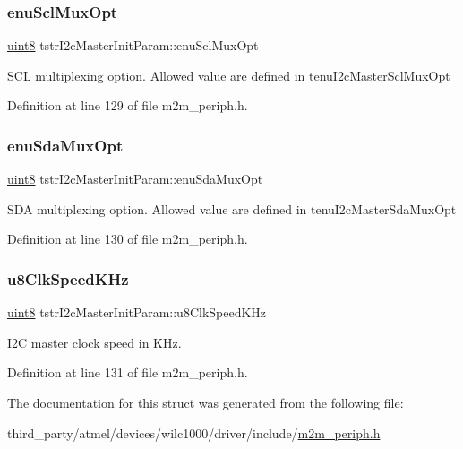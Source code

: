 \subsubsection{\texorpdfstring{enu\+Scl\+Mux\+Opt}{enuSclMuxOpt}}
{\footnotesize\ttfamily \hyperlink{group__DataT_ga4df709a77647e870bbf1d955b8edc9a6}{uint8} tstr\+I2c\+Master\+Init\+Param\+::enu\+Scl\+Mux\+Opt}

S\+CL multiplexing option. Allowed value are defined in tenu\+I2c\+Master\+Scl\+Mux\+Opt 

Definition at line 129 of file m2m\+\_\+periph.\+h.

\mbox{\label{structtstrI2cMasterInitParam_a2ccf575c48101934f675e9ac964a9ee5}} 
\subsubsection{\texorpdfstring{enu\+Sda\+Mux\+Opt}{enuSdaMuxOpt}}
{\footnotesize\ttfamily \hyperlink{group__DataT_ga4df709a77647e870bbf1d955b8edc9a6}{uint8} tstr\+I2c\+Master\+Init\+Param\+::enu\+Sda\+Mux\+Opt}

S\+DA multiplexing option. Allowed value are defined in tenu\+I2c\+Master\+Sda\+Mux\+Opt 

Definition at line 130 of file m2m\+\_\+periph.\+h.

\mbox{\label{structtstrI2cMasterInitParam_a30a28a8cbc543e37689b5b2b363fee21}} 
\subsubsection{\texorpdfstring{u8\+Clk\+Speed\+K\+Hz}{u8ClkSpeedKHz}}
{\footnotesize\ttfamily \hyperlink{group__DataT_ga4df709a77647e870bbf1d955b8edc9a6}{uint8} tstr\+I2c\+Master\+Init\+Param\+::u8\+Clk\+Speed\+K\+Hz}

I2C master clock speed in K\+Hz. 

Definition at line 131 of file m2m\+\_\+periph.\+h.



The documentation for this struct was generated from the following file\+:\begin{DoxyCompactItemize}
\item 
third\+\_\+party/atmel/devices/wilc1000/driver/include/\hyperlink{m2m__periph_8h}{m2m\+\_\+periph.\+h}\end{DoxyCompactItemize}
